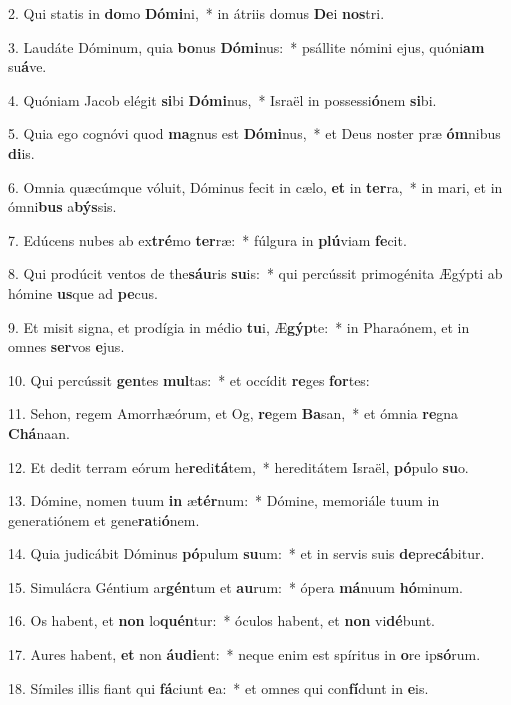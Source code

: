 2. Qui statis in \textbf{do}mo \textbf{Dó}\textbf{mi}ni,~*  in átriis domus \textbf{De}i \textbf{nos}tri.\

3. Laudáte Dóminum, quia \textbf{bo}nus \textbf{Dó}\textbf{mi}nus:~*  psállite nómini ejus, quóni\textbf{am} su\textbf{á}ve.\

4. Quóniam Jacob elégit \textbf{si}bi \textbf{Dó}\textbf{mi}nus,~*  Israël in possessi\textbf{ó}nem \textbf{si}bi.\

5. Quia ego cognóvi quod \textbf{ma}gnus est \textbf{Dó}\textbf{mi}nus,~*  et Deus noster præ \textbf{óm}nibus \textbf{di}is.\

6. Omnia quæcúmque vóluit, Dóminus fecit in cælo, \textbf{et} in \textbf{ter}ra,~*  in mari, et in ómni\textbf{bus} a\textbf{býs}sis.\

7. Edúcens nubes ab ex\textbf{tré}mo \textbf{ter}ræ:~*  fúlgura in \textbf{plú}viam \textbf{fe}cit.\

8. Qui prodúcit ventos de the\textbf{sáu}ris \textbf{su}is:~*  qui percússit primogénita Ægýpti ab hómine \textbf{us}que ad \textbf{pe}cus.\

9. Et misit signa, et prodígia in médio \textbf{tu}i, Æ\textbf{gýp}te:~*  in Pharaónem, et in omnes \textbf{ser}vos \textbf{e}jus.\

10. Qui percússit \textbf{gen}tes \textbf{mul}tas:~*  et occídit \textbf{re}ges \textbf{for}tes:\

11. Sehon, regem Amorrhæórum, et Og, \textbf{re}gem \textbf{Ba}san,~*  et ómnia \textbf{re}gna \textbf{Chá}naan.\

12. Et dedit terram eórum he\textbf{re}di\textbf{tá}tem,~*  hereditátem Israël, \textbf{pó}pulo \textbf{su}o.\

13. Dómine, nomen tuum \textbf{in} æ\textbf{tér}num:~*  Dómine, memoriále tuum in generatiónem et gene\textbf{ra}ti\textbf{ó}nem.\

14. Quia judicábit Dóminus \textbf{pó}pulum \textbf{su}um:~*  et in servis suis \textbf{de}pre\textbf{cá}bitur.\

15. Simulácra Géntium ar\textbf{gén}tum et \textbf{au}rum:~*  ópera \textbf{má}nuum \textbf{hó}minum.\

16. Os habent, et \textbf{non} lo\textbf{quén}tur:~*  óculos habent, et \textbf{non} vi\textbf{dé}bunt.\

17. Aures habent, \textbf{et} non \textbf{áu}\textbf{di}ent:~*  neque enim est spíritus in \textbf{o}re ip\textbf{só}rum.\

18. Símiles illis fiant qui \textbf{fá}ciunt \textbf{e}a:~*  et omnes qui con\textbf{fí}dunt in \textbf{e}is.\

